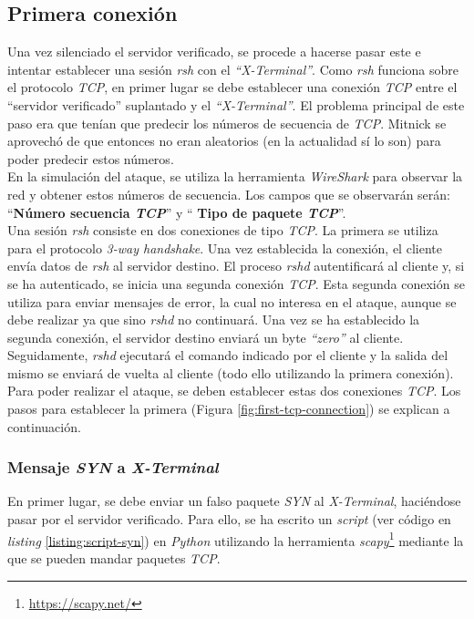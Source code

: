 \documentclass{article}
\begin{document}
\subsection{Primera conexión}
Una vez silenciado el servidor verificado, se procede a hacerse pasar este e intentar establecer una sesión \textit{rsh} con el \textit{``X-Terminal''}. Como \textit{rsh} funciona sobre el protocolo \textit{TCP}, en primer lugar se debe establecer una conexión \textit{TCP} entre el ``servidor verificado'' suplantado y el \textit{``X-Terminal''}. El problema principal de este paso era que tenían que predecir los números de secuencia de \textit{TCP}. Mitnick se aprovechó de que entonces no eran aleatorios (en la actualidad sí lo son) para poder predecir estos números. \\

En la simulación del ataque, se utiliza la herramienta \textit{WireShark} para observar la red y obtener estos números de secuencia. Los campos que se observarán serán: ``\textbf{Número secuencia \textit{TCP}}'' y `` \textbf{Tipo de paquete \textit{TCP}}''.\\

Una sesión \textit{rsh} consiste en dos conexiones de tipo \textit{TCP}. La primera se utiliza para el protocolo \textit{3-way handshake}. Una vez establecida la conexión, el cliente envía datos de \textit{rsh} al servidor destino. El proceso \textit{rshd} autentificará al cliente y, si se ha autenticado, se inicia una segunda conexión \textit{TCP}.
Esta segunda conexión se utiliza para enviar mensajes de error, la cual no interesa en el ataque, aunque se debe realizar ya que sino \textit{rshd} no continuará. Una vez se ha establecido la segunda conexión, el servidor destino enviará un byte \textit{``zero''} al cliente. Seguidamente, \textit{rshd} ejecutará el comando indicado por el cliente y la salida del mismo se enviará de vuelta al cliente (todo ello utilizando la primera conexión).\\

Para poder realizar el ataque, se deben establecer estas dos conexiones \textit{TCP}. Los pasos para establecer la primera (Figura \ref{fig:first-tcp-connection}) se explican a continuación.

\subsubsection{Mensaje \textit{SYN} a \textit{X-Terminal}}
En primer lugar, se debe enviar un falso paquete \textit{SYN} al \textit{X-Terminal}, haciéndose pasar por el servidor verificado. Para ello, se ha escrito un \textit{script} (ver código en \textit{listing }\ref{listing:script-syn}) en \textit{Python} utilizando la herramienta \textit{scapy}\footnote{\url{https://scapy.net/}} mediante la que se pueden mandar paquetes \textit{TCP}.\\
\end{document}
